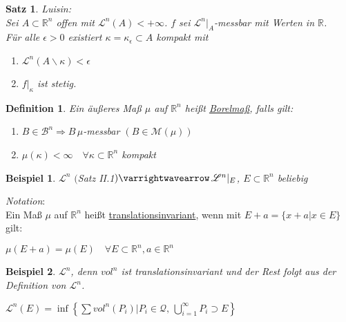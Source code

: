 \documentclass[11pt]{memoir}
\theoremstyle{changebreak}
\newtheorem{Definition}{Definition}[chapter]
\newtheorem{Beispiel}{Beispiel}[chapter]
\newtheorem{Satz}{Satz}[chapter]
\begin{document}
\begin{Satz}
\emph{Luisin}: \\
Sei $A \subset \mathbb R^n$ offen mit $\mathscr L^n(A) < + \infty$. $f$ sei $\mathscr L^n|_A$-messbar mit Werten in $\mathbb R$. \\
Für alle $\epsilon > 0$ existiert $\kappa = \kappa_\epsilon \subset A$ kompakt mit
\begin{enumerate}
	\item $\mathscr L^n(A \backslash \kappa) < \epsilon$
	\item $f|_\kappa$ ist stetig.
\end{enumerate}
\end{Satz}



\begin{Definition}
Ein äußeres Maß $\mu$ auf $\mathbb R^n$ heißt \underline{Borelmaß}, falls gilt:
\begin{enumerate}
	\item $B \in \mathscr B^n \Rightarrow B \, \mu$-messbar $(B \in \mathscr M(\mu))$
	\item $\mu(\kappa) < \infty \quad \forall \kappa \subset \mathbb R^n$ kompakt
\end{enumerate}
\end{Definition}

\begin{Beispiel}
$\mathscr L^n$ $($Satz II.1$) \varrightwavearrow \, \mathscr L^n|_E$, $E \subset \mathbb R^n$ beliebig
\end{Beispiel}

\emph{Notation}: \\
Ein Maß $\mu$ auf $\mathbb R^n$ heißt \underline{translationsinvariant}, wenn mit $E + a = \{x +a | x \in E\}$ gilt:
\begin{center}
	$\mu(E+a) = \mu(E) \quad \forall E \subset \mathbb R^n, a \in \mathbb R^n$
\end{center}

\begin{Beispiel}
$\mathscr L^n$, denn $vol^n$ ist translationsinvariant und der Rest folgt aus der Definition von $\mathscr L^n$. \\
\begin{center}
	$\mathscr L^n(E) = \inf\left\{ \sum vol^n(P_i) | P_i \in \mathscr Q, \,\bigcup\limits_{i=1}^\infty P_i \supset E \right\}$
\end{center}
\end{Beispiel}
\end{document}
